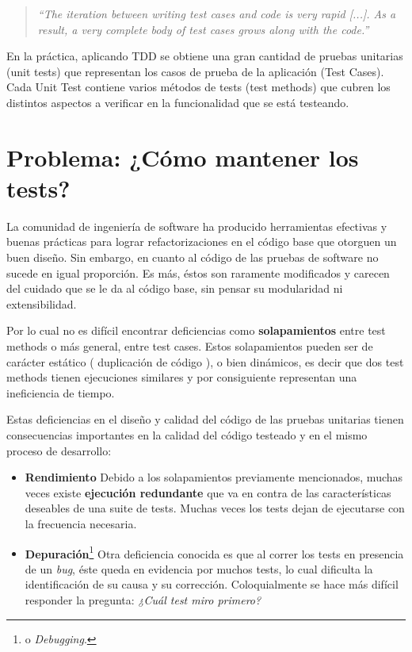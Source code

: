 \begin{quote}
\emph{``The iteration between writing test cases and code is very rapid [...]. As a result, a very complete body of test cases grows along with the code.''}
\end{quote}


\par En la práctica, aplicando TDD se obtiene una gran cantidad de pruebas unitarias (unit tests) que representan los casos de prueba de la aplicación (Test Cases). Cada Unit Test contiene varios métodos de tests (test methods) que cubren los distintos aspectos a verificar en la funcionalidad que se está testeando.


\section{Problema: ¿Cómo mantener los tests?}

\par La comunidad de ingeniería de software ha producido herramientas efectivas y buenas prácticas para lograr refactorizaciones en el código base que otorguen un buen diseño. Sin embargo, en cuanto al código de las pruebas de software no sucede en igual proporción. Es más, éstos son raramente modificados y carecen del cuidado que se le da al código base, sin pensar su modularidad ni extensibilidad. 

\par Por lo cual no es difícil encontrar deficiencias como \textbf{solapamientos} entre test methods o más general, entre test cases. Estos solapamientos pueden ser de carácter estático ( duplicación de código ), o bien dinámicos, es decir que dos test methods tienen ejecuciones similares y por consiguiente representan una ineficiencia de tiempo.

\par Estas deficiencias en el diseño y calidad del código de las pruebas unitarias tienen consecuencias importantes en la calidad del código testeado y en el mismo proceso de desarrollo:
\begin{itemize}
\item \textbf{Rendimiento} Debido a los solapamientos previamente mencionados, muchas veces existe \textbf{ejecución redundante} que va en contra de las características deseables de una suite de tests. Muchas veces los tests dejan de ejecutarse con la frecuencia necesaria.
\item \textbf{Depuración}\footnote{o \emph{Debugging}.} Otra deficiencia conocida es que al correr los tests en presencia de un \emph{bug}, éste queda en evidencia por muchos tests, lo cual dificulta la identificación de su causa y su corrección. Coloquialmente se hace más difícil responder la pregunta: \emph{¿Cuál test miro primero?}
\end{itemize}
 
